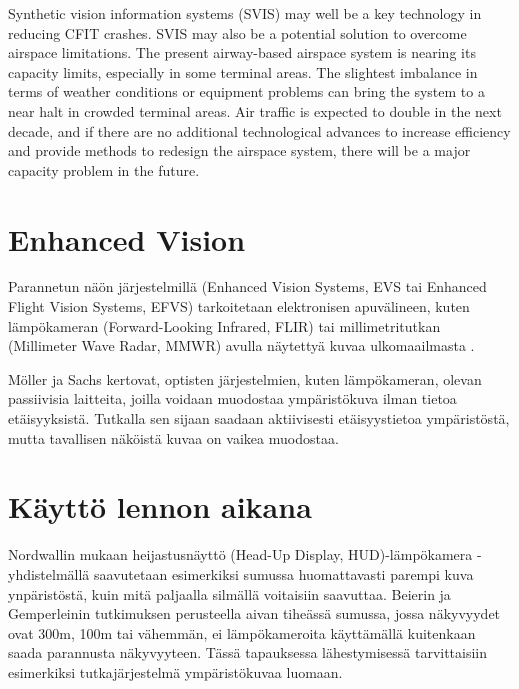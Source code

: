 \documentclass[utf8,bachelor,manualbib]{gradu3}
\begin{document}
Synthetic vision information systems
(SVIS) may well be a key technology in reducing CFIT crashes. SVIS may also be
a potential solution to overcome airspace limitations. The present airway-based
airspace system is nearing its capacity limits, especially in some terminal areas.
The slightest imbalance in terms of weather conditions or equipment problems can
bring the system to a near halt in crowded terminal areas. Air traffic is expected to
double in the next decade, and if there are no additional technological advances to
increase efficiency and provide methods to redesign the airspace system, there will
be a major capacity problem in the future. \citep{schnell2004}

















\section{Enhanced Vision}

Parannetun näön järjestelmillä (Enhanced Vision Systems, EVS tai Enhanced Flight Vision Systems, EFVS) tarkoitetaan elektronisen apuvälineen, kuten lämpökameran (Forward-Looking Infrared, FLIR) tai millimetritutkan (Millimeter Wave Radar, MMWR) avulla näytettyä kuvaa ulkomaailmasta \citep{baileyym2007}.

Möller ja Sachs \citeyearpar{mollersachs1994} kertovat, optisten järjestelmien, kuten lämpökameran, olevan passiivisia laitteita, joilla voidaan muodostaa ympäristökuva ilman tietoa etäisyyksistä. Tutkalla sen sijaan saadaan aktiivisesti etäisyystietoa ympäristöstä, mutta tavallisen näköistä kuvaa on vaikea muodostaa. 





\section{Käyttö lennon aikana}

Nordwallin \citeyearpar{nordwall1993} mukaan heijastusnäyttö (Head-Up Display, HUD)-lämpökamera -yhdistelmällä saavutetaan esimerkiksi sumussa huomattavasti parempi kuva ynpäristöstä, kuin mitä paljaalla silmällä voitaisiin saavuttaa. Beierin ja Gemperleinin \citeyearpar{beiergemperlein2004} tutkimuksen perusteella aivan tiheässä sumussa, jossa näkyvyydet ovat 300m, 100m tai vähemmän, ei lämpökameroita käyttämällä kuitenkaan saada parannusta näkyvyyteen. Tässä tapauksessa lähestymisessä tarvittaisiin esimerkiksi tutkajärjestelmä ympäristökuvaa luomaan.
\end{document}
